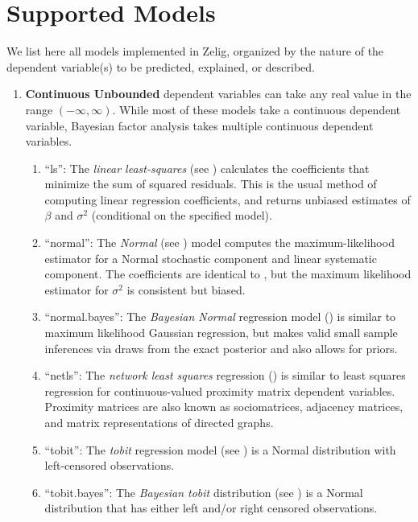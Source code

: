 \documentclass[letterpaper,10pt,english]{sphinxmanual}
\begin{document}
\section{Supported Models}
\label{4_statistical_commands:supported-models}
We list here all models implemented in Zelig, organized by the nature of
the dependent variable(s) to be predicted, explained, or described.
\begin{enumerate}
\item {} 
\textbf{Continuous Unbounded} dependent variables can take any real value
in the range \((-\infty, \infty)\). While most of these models
take a continuous dependent variable, Bayesian factor analysis takes
multiple continuous dependent variables.
\begin{enumerate}
\item {} 
“ls”: The \emph{linear least-squares} (see ) calculates the
coefficients that minimize the sum of squared residuals. This is
the usual method of computing linear regression coefficients, and
returns unbiased estimates of \(\beta\) and \(\sigma^2\)
(conditional on the specified model).

\item {} 
“normal”: The \emph{Normal} (see ) model computes the
maximum-likelihood estimator for a Normal stochastic component and
linear systematic component. The coefficients are identical to
, but the maximum likelihood estimator for \(\sigma^2\)
is consistent but biased.

\item {} 
“normal.bayes”: The \emph{Bayesian Normal} regression model () is
similar to maximum likelihood Gaussian regression, but makes valid
small sample inferences via draws from the exact posterior and
also allows for priors.

\item {} 
“netls”: The \emph{network least squares} regression () is similar to
least squares regression for continuous-valued proximity matrix
dependent variables. Proximity matrices are also known as
sociomatrices, adjacency matrices, and matrix representations of
directed graphs.

\item {} 
“tobit”: The \emph{tobit} regression model (see ) is a Normal
distribution with left-censored observations.

\item {} 
“tobit.bayes”: The \emph{Bayesian tobit} distribution (see ) is a
Normal distribution that has either left and/or right censored
observations.


\end{enumerate}
\end{enumerate}
\end{document}
